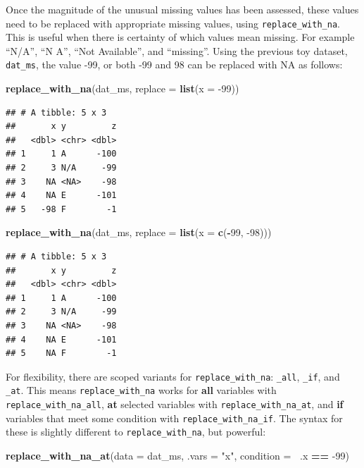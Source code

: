 \documentclass[]{article}
\newenvironment{Shaded}{\begin{snugshade}}{\end{snugshade}}
\newcommand{\DataTypeTok}[1]{\textcolor[rgb]{0.13,0.29,0.53}{#1}}
\newcommand{\DecValTok}[1]{\textcolor[rgb]{0.00,0.00,0.81}{#1}}
\newcommand{\KeywordTok}[1]{\textcolor[rgb]{0.13,0.29,0.53}{\textbf{#1}}}
\newcommand{\NormalTok}[1]{#1}
\newcommand{\OperatorTok}[1]{\textcolor[rgb]{0.81,0.36,0.00}{\textbf{#1}}}
\newcommand{\StringTok}[1]{\textcolor[rgb]{0.31,0.60,0.02}{#1}}
\theoremstyle{definition}
\theoremstyle{definition}
\theoremstyle{definition}
\theoremstyle{remark}
\begin{document}
Once the magnitude of the unusual missing values has been assessed,
these values need to be replaced with appropriate missing values, using
\texttt{replace\_with\_na}. This is useful when there is certainty of
which values mean missing. For example ``N/A'', ``N A'', ``Not
Available'', and ``missing''. Using the previous toy dataset,
\texttt{dat\_ms}, the value -99, or both -99 and 98 can be replaced with
NA as follows:

\begin{Shaded}
\begin{Highlighting}[]
\KeywordTok{replace_with_na}\NormalTok{(dat_ms, }\DataTypeTok{replace =} \KeywordTok{list}\NormalTok{(}\DataTypeTok{x =} \DecValTok{-99}\NormalTok{))}
\end{Highlighting}
\end{Shaded}

\begin{verbatim}
## # A tibble: 5 x 3
##       x y         z
##   <dbl> <chr> <dbl>
## 1     1 A      -100
## 2     3 N/A     -99
## 3    NA <NA>    -98
## 4    NA E      -101
## 5   -98 F        -1
\end{verbatim}

\begin{Shaded}
\begin{Highlighting}[]
\KeywordTok{replace_with_na}\NormalTok{(dat_ms, }\DataTypeTok{replace =} \KeywordTok{list}\NormalTok{(}\DataTypeTok{x =} \KeywordTok{c}\NormalTok{(}\OperatorTok{-}\DecValTok{99}\NormalTok{, }\DecValTok{-98}\NormalTok{)))}
\end{Highlighting}
\end{Shaded}

\begin{verbatim}
## # A tibble: 5 x 3
##       x y         z
##   <dbl> <chr> <dbl>
## 1     1 A      -100
## 2     3 N/A     -99
## 3    NA <NA>    -98
## 4    NA E      -101
## 5    NA F        -1
\end{verbatim}

For flexibility, there are scoped variants for
\texttt{replace\_with\_na}: \texttt{\_all}, \texttt{\_if}, and
\texttt{\_at}. This means \texttt{replace\_with\_na} works for
\textbf{all} variables with \texttt{replace\_with\_na\_all}, \textbf{at}
selected variables with \texttt{replace\_with\_na\_at}, and \textbf{if}
variables that meet some condition with \texttt{replace\_with\_na\_if}.
The syntax for these is slightly different to
\texttt{replace\_with\_na}, but powerful:

\begin{Shaded}
\begin{Highlighting}[]
\KeywordTok{replace_with_na_at}\NormalTok{(}\DataTypeTok{data =}\NormalTok{ dat_ms,}
                   \DataTypeTok{.vars =} \StringTok{"x"}\NormalTok{,}
                   \DataTypeTok{condition =} \OperatorTok{~}\NormalTok{.x }\OperatorTok{==}\StringTok{ }\DecValTok{-99}\NormalTok{)}
\end{Highlighting}
\end{Shaded}
\end{document}
